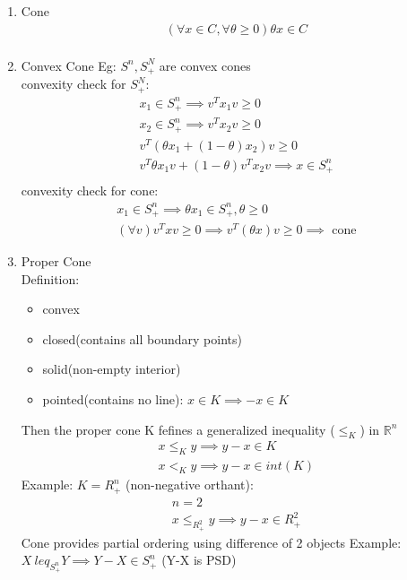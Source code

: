 \documentclass[12pt,letter]{article}
\newcommand{\R}{\mathbb{R}}
\begin{document}
\begin{enumerate}
\item Cone
  \begin{align*}
    (\forall x \in C, \forall \theta \geq 0) \theta x \in C\\
  \end{align*}
\item Convex Cone
  Eg: $S^n, S^N_+$ are convex cones\\
  convexity check for $S^N_+$:\\
  \begin{align*}
    x_1 \in S^n_+ \implies v^Tx_1v \geq 0\\
    x_2 \in S^n_+ \implies v^Tx_2v \geq 0\\
    v^T(\theta x_1 + (1-\theta)x_2)v \geq 0\\
    v^T\theta x_1 v + (1-\theta)v^T x_2 v \implies x \in S^n_+\\
  \end{align*}
  convexity check for cone:\\
  \begin{align*}
    x_1 \in S^n_+ \implies \theta x_1 \in S^n_+, \theta \geq 0\\
    (\forall v) v^T x v \geq 0 \implies v^T(\theta x) v \geq 0 \implies \text{ cone}
  \end{align*}
\item Proper Cone\\
  Definition:
  \begin{itemize}
  \item convex
  \item closed(contains all boundary points)
  \item solid(non-empty interior)
  \item pointed(contains no line): $x \in K \implies -x \in K$
  \end{itemize}
  Then the proper cone K fefines a generalized inequality ($\leq_K$) in $\R^n$
  \begin{align*}
    x \leq_K y \implies y-x \in K\\
    x <_K y \implies y-x \in int(K)
  \end{align*}
  Example: $K=R^n_+$ (non-negative orthant):
  \begin{align*}
    n = 2\\
    x \leq_{R^2_+} y \implies y-x \in R^2_+
  \end{align*}
  Cone provides partial ordering using difference of 2 objects
  Example: $X\ leq_{S^n_+} Y \implies Y-X \in S^n_+$ (Y-X is PSD)

  \pagebreak
  

\end{enumerate}
\end{document}
